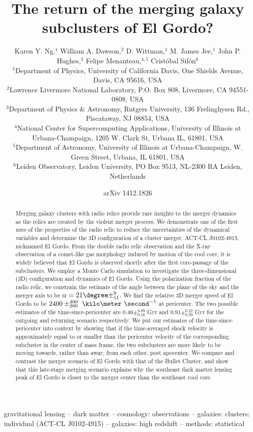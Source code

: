\documentclass[letterpaper,useAMS,usenatbib]{mn2e}
\title[The return of the merging galaxy subclusters of El Gordo?]
{The return of the merging galaxy subclusters of El Gordo?}
\author[Karen Y. Ng et al.]{Karen Y. Ng,$^{1}$
	William A. Dawson,$^{2}$ 
	D. Wittman,$^{1}$
	M. James Jee,$^{1}$ 
	John P. Hughes,$^{3}$ 
	\newauthor
	Felipe Menanteau,$^{4, 5}$
	Crist\'{o}bal Sif\'{o}n$^{6}$\\
$^{1}$Department of Physics, University of California Davis, One Shields
Avenue, Davis, CA 95616, USA\\ 
$^{2}$Lawrence Livermore National Laboratory, P.O. Box 808, Livermore, CA 94551-0808, USA \\
$^3$Department of Physics \& Astronomy,
Rutgers University, 136 Frelinghysen Rd., Piscataway, NJ 08854, USA\\
$^{4}$National Center for Supercomputing Applications, University of
Illinois at Urbana-Champaign, 1205 W. Clark St, Urbana IL, 61801, USA\\
$^{5}$Department of Astronomy, University of Illinois at Urbana-Champaign,
W. Green Street, Urbana, IL 61801, USA\\
$^{6}$Leiden Observatory, Leiden University, PO Box 9513, NL-2300 RA
Leiden, Netherlands\\}
\begin{document}
\date{arXiv 1412.1826} \pagerange{\pageref{firstpage}--\pageref{lastpage}}
 \maketitle \label{firstpage}
\begin{abstract} 
Merging galaxy clusters with radio relics provide rare insights to the merger
dynamics as the relics are created by the violent merger process. 
We demonstrate one of the first uses of the
properties of the radio relic to reduce the uncertainties of the dynamical variables 
and determine the 3D configuration of a cluster merger, ACT-CL J0102-4915, nicknamed El Gordo. 
From the double radio relic observation and the X-ray observation of a
comet-like gas morphology induced by motion of the cool core, 
it is widely believed that El Gordo is observed shortly after the first
core-passage of the subclusters.
We employ a Monte Carlo simulation to investigate the three-dimensional (3D)
configuration and dynamics of El Gordo. 
Using the polarization
fraction of the radio relic, we constrain the estimate of the
angle between the plane of the sky and the merger axis to be $\alpha = 21\degree
\pm^9_{11}$. We find the relative 3D merger speed of El Gordo to be
$2400\pm^{400}_{200}~\kilo\meter~\second^{-1}$ at pericenter. The two possible
estimates of the time-since-pericenter are $0.46\pm^{0.09}_{0.16}$ Gyr and
$0.91\pm^{0.22}_{0.39}$ Gyr for the outgoing and returning scenario respectively.
We put our estimates of
the time-since-pericenter into context by showing that if the time-averaged
shock velocity is approximately equal to or smaller than the pericenter velocity of the
corresponding subcluster in the 
center of mass frame, the two subclusters are more likely to be moving towards, rather
than away, from each other, post apocenter. 
We compare and contrast the merger scenario of El Gordo with that of the Bullet
Cluster, and show that this late-stage merging scenario 
explains why the southeast dark matter lensing peak of El Gordo is
closer to the merger center than the southeast cool core. 
\end{abstract}
\begin{keywords}
gravitational lensing -- dark matter -- cosmology: observations -- galaxies: clusters: individual (ACT-CL J0102-4915) --
galaxies: high redshift -- methods: statistical 
\end{keywords}
\end{document}
